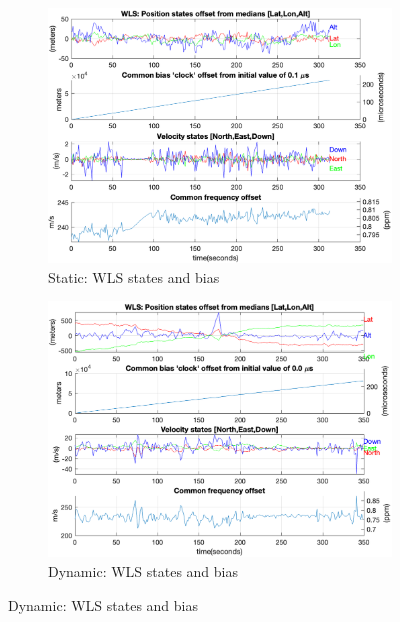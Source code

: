         \begin{figure}[h!]
            \centering
            \begin{subfigure}{0.23\textwidth}
                \includegraphics[width=\textwidth]{images/tests/Monte_Cappuccini/png/Samsung_A51_Monte_Cappuccini_fig5.png}
                \caption{Static: WLS states and bias}
                \label{fig:WLS_a}
            \end{subfigure}
            \hfill
            \begin{subfigure}{0.23\textwidth}
                \includegraphics[width=\textwidth]{images/tests/Tram_15_trip_Castello_to_Pescatore/filtered/Samsung_A51_Tram_15_trip_Castello_to_Pescatore_fig5.png}
                \caption{Dynamic: WLS states and bias}
                \label{fig:WLS_b}
            \end{subfigure}
        \end{figure}
    
